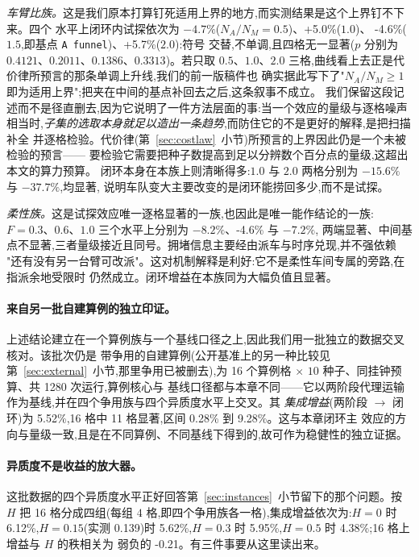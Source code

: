 \documentclass[manuscript,screen,review]{acmart}
\newcommand{\GainProbeStarve}{4.7\%}     %
\newcommand{\GainProbeFleetBase}{-4.6\%} %
\newcommand{\GainProbeFleetOne}{+5.0\%}  %
\newcommand{\GainProbeFleetTwo}{+5.7\%}  %
\newcommand{\MatrixCells}{16}
\newcommand{\MatrixRuns}{1280}
\newcommand{\GainIntegMatrix}{5.52\%}    %
\newcommand{\SigIntegMatrix}{11}         %
\newcommand{\GainIntegMatrixLo}{0.28\%}
\newcommand{\GainIntegMatrixHi}{9.28\%}
\newcommand{\GainIntegHZero}{6.12\%}
\newcommand{\GainIntegHLow}{5.62\%}      %
\newcommand{\GainIntegHMid}{5.95\%}      %
\newcommand{\GainIntegHHigh}{4.38\%}     %
\newcommand{\MatrixHMeasLow}{0.139}      %
\newcommand{\RhoIntegH}{-0.21}           %
\begin{document}
\emph{车臂比族。}这是我们原本打算钉死适用上界的地方,而实测结果是这个上界钉不下来。四个
水平上闭环内试探依次为 $-\GainProbeStarve$($N_A/N_M=0.5$)、\GainProbeFleetOne{}($1.0$)、
\GainProbeFleetBase{}($1.5$,即基点 \texttt{A funnel})、\GainProbeFleetTwo{}($2.0$):符号
交替,不单调,且四格无一显著($p$ 分别为 $0.4121$、$0.2011$、$0.1386$、$0.3313$)。若只取
$0.5$、$1.0$、$2.0$ 三格,曲线看上去正是代价律所预言的那条单调上升线,我们的前一版稿件也
确实据此写下了"$N_A/N_M\ge 1$ 即为适用上界";把夹在中间的基点补回去之后,这条叙事不成立。
我们保留这段记述而不是径直删去,因为它说明了一件方法层面的事:当一个效应的量级与逐格噪声
相当时,\emph{子集的选取本身就足以造出一条趋势},而防住它的不是更好的解释,是把扫描补全
并逐格检验。代价律(第~\ref{sec:costlaw}~小节)所预言的上界因此仍是一个未被检验的预言——
要检验它需要把种子数提高到足以分辨数个百分点的量级,这超出本文的算力预算。
闭环本身在本族上则清晰得多:$1.0$ 与 $2.0$ 两格分别为 $-15.6\%$ 与 $-37.7\%$,均显著,
说明车队变大主要改变的是闭环能捞回多少,而不是试探。

\emph{柔性族。}这是试探效应唯一逐格显著的一族,也因此是唯一能作结论的一族:
$F=0.3$、$0.6$、$1.0$ 三个水平上分别为 $-8.2\%$、\GainProbeFleetBase{} 与 $-7.2\%$,
两端显著、中间基点不显著,三者量级接近且同号。拥堵信息主要经由派车与时序兑现,并不强依赖
"还有没有另一台臂可改派"。这对机制解释是利好:它不是柔性车间专属的旁路,在指派余地受限时
仍然成立。闭环增益在本族同为大幅负值且显著。

\paragraph{来自另一批自建算例的独立印证。}
上述结论建立在一个算例族与一个基线口径之上,因此我们用一批独立的数据交叉核对。该批次仍是
带争用的自建算例(公开基准上的另一种比较见第~\ref{sec:external}~小节,那里争用已被删去),为
\MatrixCells{} 个算例格 $\times$ $10$ 种子、同挂钟预算、共 \MatrixRuns{} 次运行,算例核心与
基线口径都与本章不同——它以两阶段代理运输作为基线,并在四个争用族与四个异质度水平上交叉。其
\emph{集成增益}(两阶段 $\to$ 闭环)为 \GainIntegMatrix{},\MatrixCells{} 格中
\SigIntegMatrix{} 格显著,区间 \GainIntegMatrixLo{} 到 \GainIntegMatrixHi{}。这与本章闭环主
效应的方向与量级一致,且是在不同算例、不同基线下得到的,故可作为稳健性的独立证据。

\paragraph{异质度不是收益的放大器。}
这批数据的四个异质度水平正好回答第~\ref{sec:instances}~小节留下的那个问题。按 $H$ 把
\MatrixCells{} 格分成四组(每组 $4$ 格,即四个争用族各一格),集成增益依次为:$H=0$ 时
\GainIntegHZero{},$H=0.15$(实测 \MatrixHMeasLow{})时 \GainIntegHLow{},$H=0.3$ 时
\GainIntegHMid{},$H=0.5$ 时 \GainIntegHHigh{};\MatrixCells{} 格上增益与 $H$ 的秩相关为
弱负的 \RhoIntegH{}。有三件事要从这里读出来。
\end{document}
